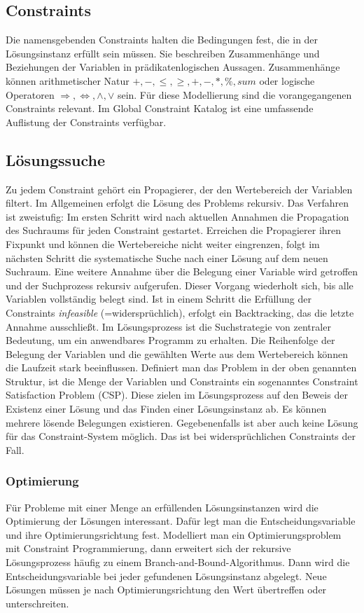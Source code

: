 \subsection{Constraints}
Die namensgebenden Constraints halten die Bedingungen fest, die in der Lösungsinstanz erfüllt sein müssen. Sie beschreiben Zusammenhänge und Beziehungen der Variablen in prädikatenlogischen Aussagen. Zusammenhänge können arithmetischer Natur $ +, -, \le, \ge, +, -, * , \%, sum$ oder logische Operatoren $\Rightarrow, \Leftrightarrow, \wedge, \vee$ sein.
Für diese Modellierung sind die vorangegangenen Constraints relevant. Im Global Constraint Katalog \cite{GlobalConstraintWeb} ist eine umfassende Auflistung der Constraints verfügbar. 
\subsection{Lösungssuche}

Zu jedem Constraint gehört ein Propagierer, der den Wertebereich der Variablen filtert. Im Allgemeinen erfolgt die Lösung des Problems rekursiv. Das Verfahren ist zweistufig: Im ersten Schritt wird nach aktuellen Annahmen die Propagation des Suchraums für jeden Constraint gestartet. Erreichen die Propagierer ihren Fixpunkt und können die Wertebereiche nicht weiter eingrenzen, folgt im nächsten Schritt die systematische Suche nach einer Lösung auf dem neuen Suchraum. Eine weitere Annahme über die Belegung einer Variable wird getroffen und der Suchprozess rekursiv aufgerufen. Dieser Vorgang wiederholt sich, bis alle Variablen vollständig belegt sind. Ist in einem Schritt die Erfüllung der Constraints \textit{infeasible} (=widersprüchlich), erfolgt ein Backtracking, das die letzte Annahme ausschließt. Im Lösungsprozess ist die Suchstrategie von zentraler Bedeutung, um ein anwendbares Programm zu erhalten. Die Reihenfolge der Belegung der Variablen und die gewählten Werte aus dem Wertebereich können die Laufzeit stark beeinflussen. \newline
 Definiert man das Problem in der oben genannten Struktur, ist die Menge der Variablen und Constraints ein sogenanntes Constraint Satisfaction Problem (CSP). Diese zielen im Lösungsprozess auf den Beweis der Existenz einer Lösung und das Finden einer Lösungsinstanz ab. Es können mehrere lösende Belegungen existieren. Gegebenenfalls ist aber auch keine Lösung für das Constraint-System möglich. Das ist bei widersprüchlichen Constraints der Fall. 

\subsubsection{Optimierung}
Für Probleme mit einer Menge an erfüllenden Lösungsinstanzen wird die Optimierung der Lösungen interessant. Dafür legt man die Entscheidungsvariable und ihre Optimierungsrichtung fest. 
Modelliert man ein Optimierungsproblem mit Constraint Programmierung, dann erweitert sich der rekursive Lösungsprozess häufig zu einem Branch-and-Bound-Algorithmus. Dann wird die Entscheidungsvariable bei jeder gefundenen Lösungsinstanz abgelegt. Neue Lösungen müssen je nach Optimierungsrichtung den Wert übertreffen oder unterschreiten.